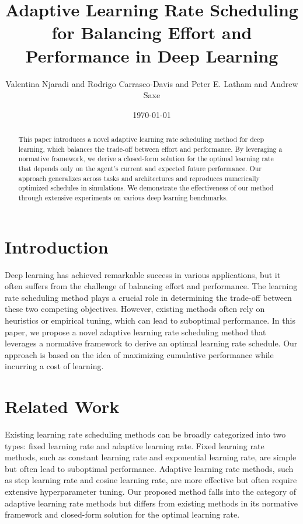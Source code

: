 \documentclass{article}
\begin{document}
\title{Adaptive Learning Rate Scheduling for Balancing Effort and Performance in Deep Learning}

\author{Valentina Njaradi and Rodrigo Carrasco-Davis and Peter E. Latham and Andrew Saxe}

\date{\today}

\maketitle

\begin{abstract}
This paper introduces a novel adaptive learning rate scheduling method for deep learning, which balances the trade-off between effort and performance. By leveraging a normative framework, we derive a closed-form solution for the optimal learning rate that depends only on the agent's current and expected future performance. Our approach generalizes across tasks and architectures and reproduces numerically optimized schedules in simulations. We demonstrate the effectiveness of our method through extensive experiments on various deep learning benchmarks.
\end{abstract}

\section{Introduction}

Deep learning has achieved remarkable success in various applications, but it often suffers from the challenge of balancing effort and performance. The learning rate scheduling method plays a crucial role in determining the trade-off between these two competing objectives. However, existing methods often rely on heuristics or empirical tuning, which can lead to suboptimal performance. In this paper, we propose a novel adaptive learning rate scheduling method that leverages a normative framework to derive an optimal learning rate schedule. Our approach is based on the idea of maximizing cumulative performance while incurring a cost of learning.

\section{Related Work}

Existing learning rate scheduling methods can be broadly categorized into two types: fixed learning rate and adaptive learning rate. Fixed learning rate methods, such as constant learning rate and exponential learning rate, are simple but often lead to suboptimal performance. Adaptive learning rate methods, such as step learning rate and cosine learning rate, are more effective but often require extensive hyperparameter tuning. Our proposed method falls into the category of adaptive learning rate methods but differs from existing methods in its normative framework and closed-form solution for the optimal learning rate.
\end{document}
